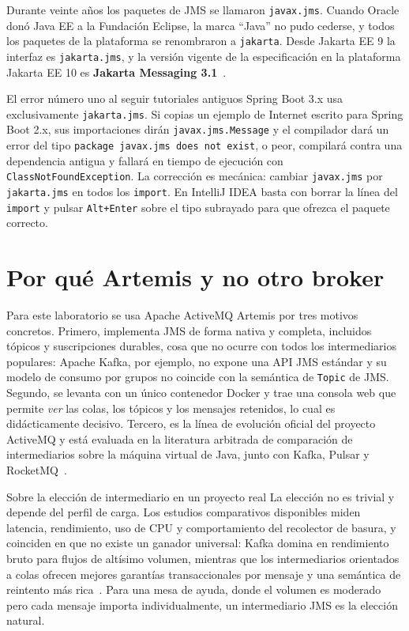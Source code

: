 \documentclass[11pt,a4paper]{book}
\newcommand{\clase}[1]{\texttt{#1}}
\begin{document}
Durante veinte años los paquetes de JMS se llamaron \clase{javax.jms}.
Cuando Oracle donó Java EE a la Fundación Eclipse, la marca ``Java'' no pudo cederse, y todos los paquetes de la plataforma se renombraron a \clase{jakarta}.
Desde Jakarta EE 9 la interfaz es \clase{jakarta.jms}, y la versión vigente de la especificación en la plataforma Jakarta EE 10 es \textbf{Jakarta Messaging 3.1}~\cite{jakartamessaging31}.

\begin{cajaAviso}{El error número uno al seguir tutoriales antiguos}
	Spring Boot 3.x usa exclusivamente \clase{jakarta.jms}.
	Si copias un ejemplo de Internet escrito para Spring Boot 2.x, sus importaciones dirán \clase{javax.jms.Message} y el compilador dará un error del tipo \texttt{package javax.jms does not exist}, o peor, compilará contra una dependencia antigua y fallará en tiempo de ejecución con \texttt{ClassNotFoundException}.
	La corrección es mecánica: cambiar \clase{javax.jms} por \clase{jakarta.jms} en todos los \texttt{import}.
	En IntelliJ IDEA basta con borrar la línea del \texttt{import} y pulsar \texttt{Alt+Enter} sobre el tipo subrayado para que ofrezca el paquete correcto.
\end{cajaAviso}

\section{Por qué Artemis y no otro broker}

Para este laboratorio se usa Apache ActiveMQ Artemis por tres motivos concretos.
Primero, implementa JMS de forma nativa y completa, incluidos tópicos y suscripciones durables, cosa que no ocurre con todos los intermediarios populares: Apache Kafka, por ejemplo, no expone una API JMS estándar y su modelo de consumo por grupos no coincide con la semántica de \clase{Topic} de JMS.
Segundo, se levanta con un único contenedor Docker y trae una consola web que permite \emph{ver} las colas, los tópicos y los mensajes retenidos, lo cual es didácticamente decisivo.
Tercero, es la línea de evolución oficial del proyecto ActiveMQ y está evaluada en la literatura arbitrada de comparación de intermediarios sobre la máquina virtual de Java, junto con Kafka, Pulsar y RocketMQ~\cite{chy2023jvmqueues}.

\begin{cajaNota}{Sobre la elección de intermediario en un proyecto real}
	La elección no es trivial y depende del perfil de carga.
	Los estudios comparativos disponibles miden latencia, rendimiento, uso de CPU y comportamiento del recolector de basura, y coinciden en que no existe un ganador universal: Kafka domina en rendimiento bruto para flujos de altísimo volumen, mientras que los intermediarios orientados a colas ofrecen mejores garantías transaccionales por mensaje y una semántica de reintento más rica~\cite{chy2023jvmqueues}.
	Para una mesa de ayuda, donde el volumen es moderado pero cada mensaje importa individualmente, un intermediario JMS es la elección natural.
\end{cajaNota}
\end{document}

